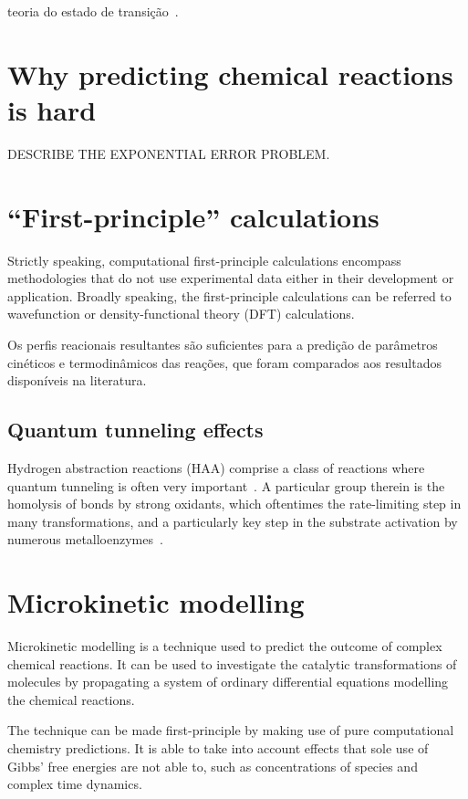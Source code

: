 teoria do estado de transição~\cite{TransitionStateTheory}. %

\section{Why predicting chemical reactions is hard}

DESCRIBE THE EXPONENTIAL ERROR PROBLEM.\@

\section{``First-principle'' calculations}

Strictly speaking, computational first-principle calculations encompass
methodologies that do not use experimental data either in their development or
application.
Broadly speaking, the first-principle calculations can be referred to
wavefunction or density-functional theory (DFT) calculations.

Os perfis reacionais resultantes são suficientes para a predição de parâmetros
cinéticos e termodinâmicos das reações, que foram comparados aos resultados
disponíveis na literatura. %

\subsection{Quantum tunneling effects}

Hydrogen abstraction reactions (HAA) comprise a class of reactions where
quantum tunneling is often very important~\cite{Bim2018}.
A particular group therein is the homolysis of  bonds by strong
oxidants, which oftentimes the rate-limiting step in many transformations, and
a particularly key step in the substrate activation by numerous
metalloenzymes~\cite{Bim2018}.

\section{Microkinetic modelling}

Microkinetic modelling is a technique used to predict the outcome of complex
chemical reactions.
It can be used to investigate the catalytic transformations of molecules by
propagating a system of ordinary differential equations modelling the chemical
reactions.

The technique can be made first-principle by making use of pure computational
chemistry predictions.
It is able to take into account effects that sole use of Gibbs' free energies
are not able to, such as concentrations of species and complex time dynamics.

